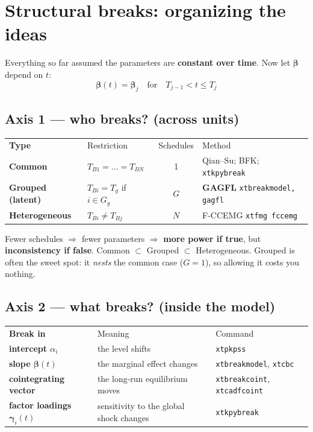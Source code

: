 \documentclass[11pt,a4paper]{article}
\newcommand{\cmd}[1]{\texttt{\textcolor{corange}{#1}}}
\newcommand{\bbeta}{\boldsymbol{\beta}}
\newcommand{\bgamma}{\boldsymbol{\gamma}}
\begin{document}
\section{Structural breaks: organizing the ideas}

\begin{idea}
Everything so far assumed the parameters are \textbf{constant over time}. Now let
$\bbeta$ depend on $t$:
\[ \bbeta(t)=\bbeta_j \quad\text{for}\quad T_{j-1}<t\le T_j \]
\end{idea}

\subsection{Axis 1 --- who breaks? (across units)}
\begin{center}
\begin{tabular}{@{}>{\bfseries}l p{5.4cm} c l@{}}
\rowcolor{cblue}\color{white}Type & \color{white}Restriction & \color{white}Schedules & \color{white}Method\\
Common & $T_{B1}=\dots=T_{BN}$ & 1 & Qian--Su; BFK; \cmd{xtkpybreak}\\
\textbf{Grouped (latent)} & $T_{Bi}=T_g$ if $i\in G_g$ & $G$ & \textbf{GAGFL} \cmd{xtbreakmodel, gagfl}\\
Heterogeneous & $T_{Bi}\neq T_{Bj}$ & $N$ & F-CCEMG \cmd{xtfmg fccemg}\\
\end{tabular}
\end{center}
\begin{cmpbox}
Fewer schedules $\Rightarrow$ fewer parameters $\Rightarrow$ \textbf{more power if true}, but
\textbf{inconsistency if false}. Common $\subset$ Grouped $\subset$ Heterogeneous. Grouped is often
the sweet spot: it \emph{nests} the common case ($G=1$), so allowing it costs you nothing.
\end{cmpbox}

\subsection{Axis 2 --- what breaks? (inside the model)}
\begin{center}
\begin{tabular}{@{}>{\bfseries}l p{7.2cm} l@{}}
\rowcolor{cpink}\color{white}Break in & \color{white}Meaning & \color{white}Command\\
intercept $\alpha_i$ & the level shifts & \cmd{xtpkpss}\\
slope $\bbeta(t)$ & the marginal effect changes & \cmd{xtbreakmodel}, \cmd{xtcbc}\\
cointegrating vector & the long-run equilibrium moves & \cmd{xtbreakcoint}, \cmd{xtcadfcoint}\\
factor loadings $\bgamma_i(t)$ & sensitivity to the global shock changes & \cmd{xtkpybreak}\\
\end{tabular}
\end{center}
\end{document}
